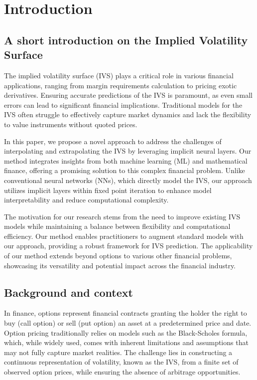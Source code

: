\section{Introduction}
\subsection{A short introduction on the Implied Volatility Surface}
The implied volatility surface (IVS) plays a critical role in various financial applications, ranging from margin requirements calculation to pricing exotic derivatives. Ensuring accurate predictions of the IVS is paramount, as even small errors can lead to significant financial implications. Traditional models for the IVS often struggle to effectively capture market dynamics and lack the flexibility to value instruments without quoted prices.

In this paper, we propose a novel approach to address the challenges of interpolating and extrapolating the IVS by leveraging implicit neural layers. Our method integrates insights from both machine learning (ML) and mathematical finance, offering a promising solution to this complex financial problem. Unlike conventional neural networks (NNs), which directly model the IVS, our approach utilizes implicit layers within fixed point iteration to enhance model interpretability and reduce computational complexity.

The motivation for our research stems from the need to improve existing IVS models while maintaining a balance between flexibility and computational efficiency. Our method enables practitioners to augment standard models with our approach, providing a robust framework for IVS prediction. The applicability of our method extends beyond options to various other financial problems, showcasing its versatility and potential impact across the financial industry.

\subsection{Background and context}
In finance, options represent financial contracts granting the holder the right to buy (call option) or sell (put option) an asset at a predetermined price and date. Option pricing traditionally relies on models such as the Black-Scholes formula, which, while widely used, comes with inherent limitations and assumptions that may not fully capture market realities. The challenge lies in constructing a continuous representation of volatility, known as the IVS, from a finite set of observed option prices, while ensuring the absence of arbitrage opportunities.

